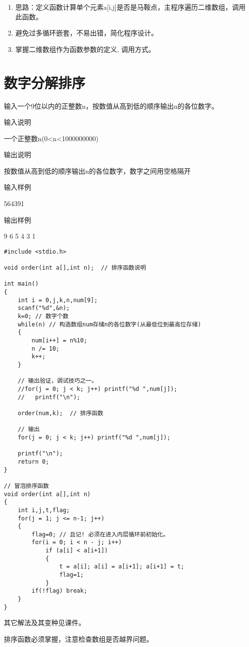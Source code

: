 \begin{note}[要点]
	\begin{enumerate}
		\item 思路：定义函数计算单个元素a[i,j]是否是马鞍点，主程序遍历二维数组，调用此函数。
		\item 避免过多循环嵌套，不易出错，简化程序设计。
		\item 掌握二维数组作为函数参数的定义, 调用方式。
	\end{enumerate}
\end{note}


\section{数字分解排序}
输入一个9位以内的正整数n，按数值从高到低的顺序输出n的各位数字。

输入说明	

一个正整数n(0<n<1000000000)

输出说明	

按数值从高到低的顺序输出n的各位数字，数字之间用空格隔开

输入样例	

564391

输出样例

9 6 5 4 3 1

\begin{lstlisting}
#include <stdio.h>

void order(int a[],int n);  // 排序函数说明

int main()
{
	int i = 0,j,k,n,num[9];
	scanf("%d",&n);
	k=0; // 数字个数 
	while(n) // 构造数组num存储n的各位数字(从最低位到最高位存储)
	{
		num[i++] = n%10;
		n /= 10;
		k++;
	} 

	// 输出验证，调试技巧之一。 
	//for(j = 0; j < k; j++) printf("%d ",num[j]);
	//   printf("\n");
	
	order(num,k);  // 排序函数
	
	// 输出
	for(j = 0; j < k; j++) printf("%d ",num[j]);
	
	printf("\n");
	return 0;
} 

// 冒泡排序函数 
void order(int a[],int n)
{ 
	int i,j,t,flag; 
	for(j = 1; j <= n-1; j++)
	{ 
		flag=0; // 且记! 必须在进入内层循环前初始化。
		for(i = 0; i < n - j; i++)
			if (a[i] < a[i+1]) 
			{ 
				t = a[i]; a[i] = a[i+1]; a[i+1] = t; 
				flag=1;
			}
		if(!flag) break;
	}
}
\end{lstlisting}

\begin{note}[要点]
	其它解法及其变种见课件。
	
	排序函数必须掌握，注意检查数组是否越界问题。
\end{note}

